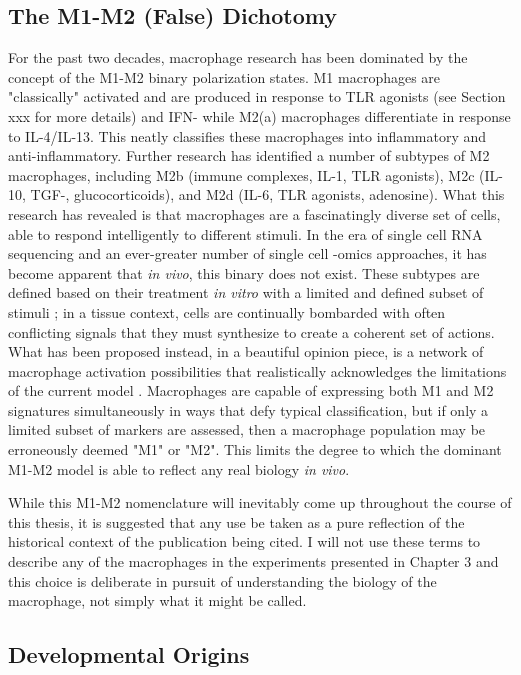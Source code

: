 \subsection{The M1-M2 (False) Dichotomy}\label{lies}

For the past two decades, macrophage research has been dominated by the concept of the M1-M2 binary polarization states. M1 macrophages are "classically" activated and are produced in response to TLR agonists (see Section xxx for more details) and IFN-\textgamma{} while M2(a) macrophages differentiate in response to IL-4/IL-13. This neatly classifies these macrophages into inflammatory and anti-inflammatory. Further research has identified a number of subtypes of M2 macrophages, including M2b (immune complexes, IL-1, TLR agonists), M2c (IL-10, TGF-\textbeta, glucocorticoids), and M2d (IL-6, TLR agonists, adenosine). What this research has revealed is that macrophages are a fascinatingly diverse set of cells, able to respond intelligently to different stimuli. In the era of single cell RNA sequencing and an ever-greater number of single cell -omics approaches, it has become apparent that \textit{in vivo}, this binary does not exist. These subtypes are defined based on their treatment \textit{in vitro} with a limited and defined subset of stimuli \citep{Gosselin2014}; in a tissue context, cells are continually bombarded with often conflicting signals that they must synthesize to create a coherent set of actions. What has been proposed instead, in a beautiful opinion piece, is a network of macrophage activation possibilities that realistically acknowledges the limitations of the current model \citep{Nahrendorf2017}. Macrophages are capable of expressing both M1 and M2 signatures simultaneously in ways that defy typical classification, but if only a limited subset of markers are assessed, then a macrophage population may be erroneously deemed "M1" or "M2". This limits the degree to which the dominant M1-M2 model is able to reflect any real biology \textit{in vivo}. 

While this M1-M2 nomenclature will inevitably come up throughout the course of this thesis, it is suggested that any use be taken as a pure reflection of the historical context of the publication being cited. I will not use these terms to describe any of the macrophages in the experiments presented in Chapter 3 and this choice is deliberate in pursuit of understanding the biology of the macrophage, not simply what it might be called.

\subsection{Developmental Origins}\label{macdev}

